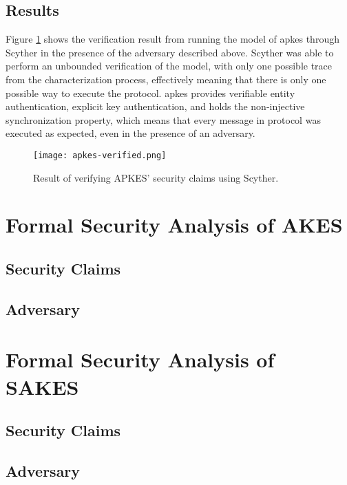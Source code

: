 \subsection{Results}

Figure \ref{fig:apkes-verified} shows the verification result from running the model of \gls{apkes} through Scyther in the presence of the adversary described above. Scyther was able to perform an unbounded verification of the model, with only one possible trace from the characterization process, effectively meaning that there is only one possible way to execute the protocol. \gls{apkes} provides verifiable entity authentication, explicit key authentication, and holds the non-injective synchronization property, which means that every message in protocol was executed as expected, even in the presence of an adversary. 

\begin{figure}[h]
	\centering
	\texttt{[image: apkes-verified.png]}
	\caption{Result of verifying APKES' security claims using Scyther.}
	\label{fig:apkes-verified}
\end{figure}




\section{Formal Security Analysis of AKES}



\subsection{Security Claims}

\subsection{Adversary}





\section{Formal Security Analysis of SAKES}

\subsection{Security Claims}

\subsection{Adversary}


